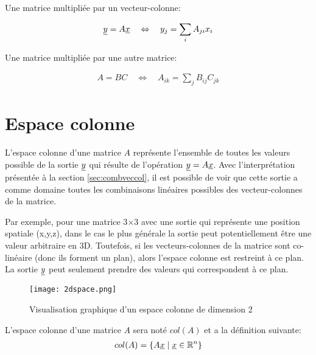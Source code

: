 Une matrice multipliée par un vecteur-colonne:

\begin{align}
\underline{y}  = A \underline{x} 
\quad \Leftrightarrow \quad
y_j = \sum_i{A_{ji} x_i }
\end{align}

Une matrice multipliée par une autre matrice:

\begin{align}
A  = B C
\quad \Leftrightarrow \quad
A_{ik} = \sum_j{B_{ij} C_{jk} }
\end{align}


\section{Espace colonne}
\label{sec:espcol}

L'espace colonne d'une matrice $A$ représente l'ensemble de toutes les valeurs possible de la sortie $\underline{y}$ qui résulte de l'opération $\underline{y} = A \underline{x}$. Avec l'interprétation présentée à la section \ref{sec:combveccol}, il est possible de voir que cette sortie a comme domaine toutes les combinaisons linéaires possibles des vecteur-colonnes de la matrice. 

Par exemple, pour une matrice 3$\times$3 avec une sortie qui représente une position spatiale (x,y,z), dans le cas le plus générale la sortie peut potentiellement être une valeur arbitraire en 3D. Toutefois, si les vecteurs-colonnes de la matrice sont co-linéaire (donc  ils forment un plan), alors l'espace colonne est restreint à ce plan. La sortie $\underline{y}$ peut seulement prendre des valeurs qui correspondent à ce plan. 

\begin{figure}[H]
	\centering
		\texttt{[image: 2dspace.png]}
	\caption{Visualisation graphique d'un espace colonne de dimension 2}
	\label{fig:2dspace}
\end{figure}


L'espace colonne d'une matrice $A$ sera noté $col(A)$ et a la définition suivante:
\begin{align}
col(A) = 
\{ A \underline{x} \; | \; \underline{x} \in \operatorname{\mathbb{R}}^n \}
\label{eq:cola}
\end{align}

